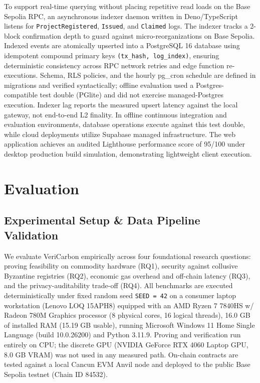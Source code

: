 \documentclass[preprint,12pt]{elsarticle}
\begin{document}
To support real-time querying without placing repetitive read loads on the Base Sepolia RPC, an asynchronous indexer daemon written in Deno/TypeScript listens for \texttt{ProjectRegistered}, \texttt{Issued}, and \texttt{Claimed} logs. The indexer tracks a 2-block confirmation depth to guard against micro-reorganizations on Base Sepolia. Indexed events are atomically upserted into a PostgreSQL 16 database using idempotent compound primary keys \texttt{(tx\_hash, log\_index)}, ensuring deterministic consistency across RPC network retries and edge function re-executions. Schema, RLS policies, and the hourly pg\_cron schedule are defined in migrations and verified syntactically; offline evaluation used a Postgres-compatible test double (PGlite) and did not exercise managed-Postgres execution. Indexer lag reports the measured upsert latency against the local gateway, not end-to-end L2 finality. In offline continuous integration and evaluation environments, database operations execute against this test double, while cloud deployments utilize Supabase managed infrastructure. The web application achieves an audited Lighthouse performance score of 95/100 under desktop production build simulation, demonstrating lightweight client execution.


\section{Evaluation}
\label{sec:evaluation}

\subsection{Experimental Setup \& Data Pipeline Validation}

We evaluate VeriCarbon empirically across four foundational research questions: proving feasibility on commodity hardware (RQ1), security against collusive Byzantine registries (RQ2), economic gas overhead and off-chain latency (RQ3), and the privacy-auditability trade-off (RQ4). All benchmarks are executed deterministically under fixed random seed \texttt{SEED = 42} on a consumer laptop workstation (Lenovo LOQ 15APH8) equipped with an AMD Ryzen 7 7840HS w/ Radeon 780M Graphics processor (8 physical cores, 16 logical threads), 16.0 GB of installed RAM (15.19 GB usable), running Microsoft Windows 11 Home Single Language (build 10.0.26200) and Python 3.11.9. Proving and verification run entirely on CPU; the discrete GPU (NVIDIA GeForce RTX 4060 Laptop GPU, 8.0 GB VRAM) was not used in any measured path. On-chain contracts are tested against a local Cancun EVM Anvil node and deployed to the public Base Sepolia testnet (Chain ID 84532).
\end{document}
